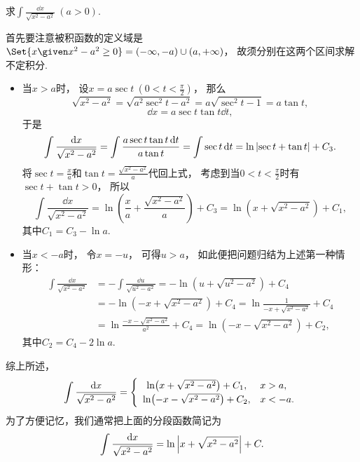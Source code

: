 \begin{example}
求\(\int \frac{\dd{x}}{\sqrt{x^2 - a^2}}\ (a>0)\).
\begin{solution}
首先要注意被积函数的定义域是\(\Set{ x \given x^2-a^2\geq0 }=(-\infty,-a)\cup(a,+\infty)\)，
故须分别在这两个区间求解不定积分.

\begin{itemize}
	\item 当\(x > a\)时，
	设\(x = a \sec t\ (0 < t < \frac\pi2)\)，
	那么\[
		\sqrt{x^2 - a^2} = \sqrt{a^2 \sec^2 t - a^2} = a \sqrt{\sec^2 t - 1} = a \tan t,
	\]\[
		\dd{x} = a \sec t \tan t \dd{t},
	\]
	于是\[
		\int \frac{\dd{x}}{\sqrt{x^2 - a^2}}
		= \int \frac{a \sec t \tan t \dd{t}}{a \tan t}
		= \int \sec t \dd{t}
		= \ln\abs{\sec t + \tan t} + C_3.
	\]
	将\(\sec t = \frac{x}{a}\)和\(\tan t = \frac{\sqrt{x^2-a^2}}{a}\)代回上式，
	考虑到当\(0<t<\frac\pi2\)时有\(\sec t + \tan t > 0\)，
	所以\[
		\int \frac{\dd{x}}{\sqrt{x^2 - a^2}}
		= \ln( \frac{x}{a} + \frac{\sqrt{x^2 - a^2}}{a} ) + C_3
		= \ln( x + \sqrt{x^2 - a^2} ) + C_1,
	\]
	其中\(C_1 = C_3 - \ln a\).

	\item 当\(x < -a\)时，
	令\(x = -u\)，
	可得\(u > a\)，
	如此便把问题归结为上述第一种情形：\begin{align*}
		\int \frac{\dd{x}}{\sqrt{x^2 - a^2}}
		&= -\int \frac{\dd{u}}{\sqrt{u^2 - a^2}}
		= -\ln(u + \sqrt{u^2 - a^2}) + C_4 \\
		&= -\ln(-x + \sqrt{x^2 - a^2}) + C_4
		= \ln\frac1{-x + \sqrt{x^2 - a^2}} + C_4 \\
		&= \ln\frac{-x - \sqrt{x^2 - a^2}}{a^2} + C_4
		= \ln(-x - \sqrt{x^2 - a^2}) + C_2,
	\end{align*}
	其中\(C_2 = C_4 - 2 \ln a\).
\end{itemize}
综上所述，\begin{equation}
	\int \frac{\dd{x}}{\sqrt{x^2 - a^2}}
	= \left\{ \def\arraystretch{1.2} \begin{array}{cl}
		\ln(x+\sqrt{x^2-a^2}) + C_1, & x>a, \\
		\ln(-x-\sqrt{x^2-a^2}) + C_2, & x<-a.
	\end{array} \right.
\end{equation}
为了方便记忆，我们通常把上面的分段函数简记为\begin{equation}
	\int \frac{\dd{x}}{\sqrt{x^2 - a^2}}
	= \ln\abs{x + \sqrt{x^2 - a^2}} + C.
\end{equation}
\end{solution}
\end{example}

